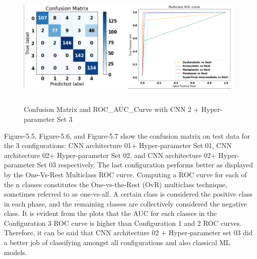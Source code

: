 \begin{figure}[H]
\centering
\includegraphics[width=160mm,height=60mm]{figures/cnn3.png}
\caption{Confusion Matrix and ROC\_AUC\_Curve with CNN 2 + Hyper-parameter Set 3}
\label{DLAccuracy}
\end{figure}

Figure-5.5, Figure-5.6, and Figure-5.7 show the confusion matrix on test data for the 3 configurations: CNN architecture 01+ Hyper-parameter Set 01,  CNN architecture 02+ Hyper-parameter Set 02, and  CNN architecture 02+ Hyper-parameter Set 03 respectively. The last configuration performs better as displayed by the One-Vs-Rest Multiclass ROC curve. Computing a ROC curve for each of the n classes constitutes the One-vs-the-Rest (OvR) multiclass technique, sometimes referred to as one-vs-all. A certain class is considered the positive class in each phase, and the remaining classes are collectively considered the negative class. It is evident from the plots that the AUC for each classes in the Configuration 3 ROC curve is higher than Configuration 1 and 2 ROC curves. Therefore, it can be said that CNN architecture 02 + Hyper-parameter set 03 did a better job of classifying amongst all configurations and also classical ML models. 


\pagebreak
